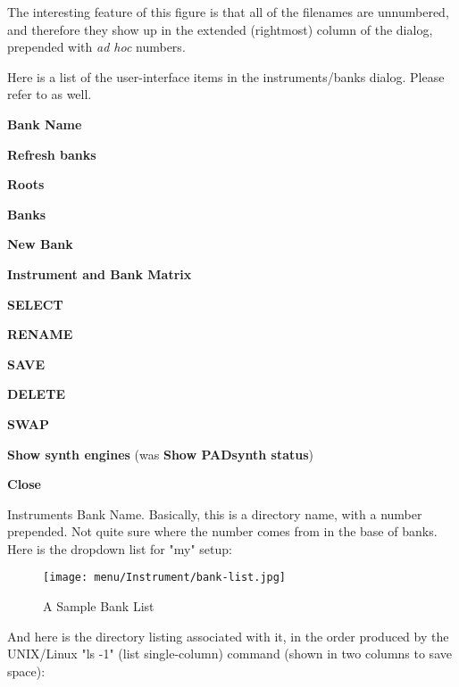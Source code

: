    The interesting feature of this figure is that
   all of the filenames are unnumbered, and therefore they show up in the
   extended (rightmost) column of the dialog, prepended with
   \textsl{ad hoc} numbers.

   Here is a list of the user-interface items in the instruments/banks dialog.
   Please refer to 
    as well.

   \begin{enumber}
      \item \textbf{Bank Name}
      \item \textbf{Refresh banks}
      \item \textbf{Roots}
      \item \textbf{Banks}
      \item \textbf{New Bank}
      \item \textbf{Instrument and Bank Matrix}
      \item \textbf{SELECT}
      \item \textbf{RENAME}
      \item \textbf{SAVE}
      \item \textbf{DELETE}
      \item \textbf{SWAP}
      \item \textbf{Show synth engines}
         (was \textbf{Show PADsynth status})
      \item \textbf{Close}
   \end{enumber}

   \setcounter{ItemCounter}{0}      %

   Instruments Bank Name.
   Basically, this is a directory name, with a number prepended.
   Not quite sure where the number comes from in the base of banks.
   Here is the dropdown list for "my" setup:

\begin{figure}[H]
   \centering 
   \texttt{[image: menu/Instrument/bank-list.jpg]}
   \caption[A Sample Bank List]{A Sample Bank List}
   \label{fig:bank_list}
\end{figure}

And here is the directory listing associated with it, in the order produced
by the UNIX/Linux "ls -1" (list single-column) command (shown in two columns
to save space):

